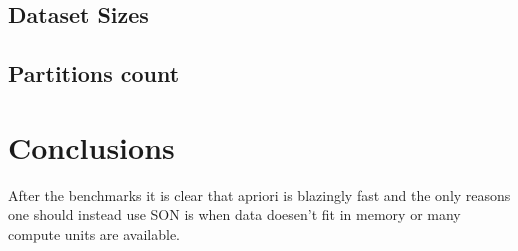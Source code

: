 \documentclass[a4paper]{article}
\begin{document}
	
	\subsection{Dataset Sizes}
	\subsection{Partitions count}
	
	\section{Conclusions}
	After the benchmarks it is clear that apriori is blazingly fast and the only reasons one should instead use SON is when data doesen't fit in memory or many compute units are available.
	
\end{document}
